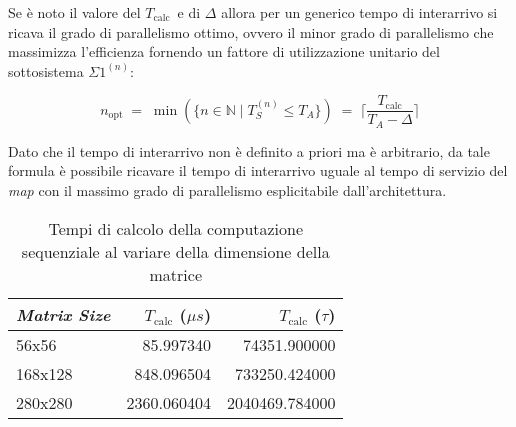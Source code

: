 \documentclass[a4paper]{article}
\newcommand{\subsystem}{$\Sigma1^{(n)}$}
\newcommand{\Tcalc}{$T_{\textrm{calc}}$}
\begin{document}
Se \`e noto il valore del \Tcalc\ e di $\Delta$ allora per un generico tempo di interarrivo si ricava il grado di parallelismo ottimo, ovvero il minor grado di parallelismo che massimizza l'efficienza fornendo un fattore di utilizzazione unitario del sottosistema \subsystem:
\begin{fleqn}[0pt]
\[ n_{\textrm{opt}} \; = \; \min(\{ n \in \mathbb{N} \; | \; T_S^{(n)} \le T_A \}) \; = \; \Bigg\lceil \frac{ T_{\textrm{calc}}}{T_A - \Delta} \Bigg\rceil  \]
\end{fleqn}
Dato che il tempo di interarrivo non \`e definito a priori ma \`e arbitrario, da tale formula \`e possibile ricavare il tempo di interarrivo uguale al tempo di servizio del \emph{map} con il massimo grado di parallelismo esplicitabile dall'architettura.

\begin{table}[!t]
  \centering
  \begin{tabular}{|l|r|r|}
    \hline
    \emph{Matrix Size} & $T_{\textrm{calc}}$ ($\mu s$) & $T_{\textrm{calc}}$ (\emph{$\tau$}) \\
    \hline
    56x56 & 85.997340 & 74351.900000 \\
    168x128 & 848.096504 & 733250.424000 \\
    280x280 & 2360.060404 & 2040469.784000 \\
    \hline
  \end{tabular}
  \caption{Tempi di calcolo della computazione sequenziale al variare della dimensione della matrice}
  \label{tab:Tcalc}
\end{table}
\end{document}
